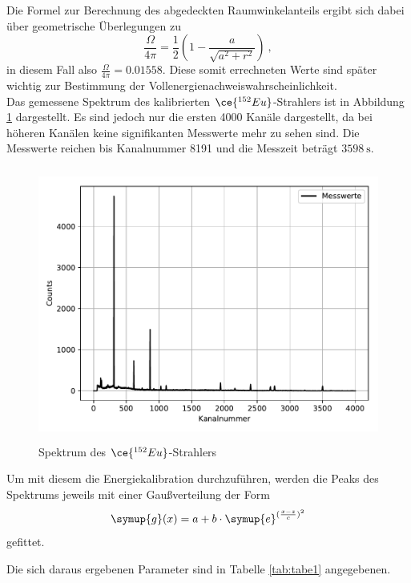 Die Formel zur Berechnung des abgedeckten Raumwinkelanteils ergibt sich dabei
über geometrische Überlegungen zu
\begin{equation}
  \frac{\Omega}{4\pi}= \frac{1}{2}(1-\frac{a}{\sqrt{a^2+r^2}})   \: ,
\end{equation}
in diesem Fall also $\frac{\Omega}{4\pi}= 0.01558$.
Diese somit errechneten Werte sind später wichtig zur Bestimmung der Vollenergienachweiswahrscheinlichkeit. \\
Das gemessene Spektrum des kalibrierten $\ce{^{152}Eu}$-Strahlers ist in Abbildung
\ref{fig:plot1} dargestellt. Es sind jedoch nur die ersten 4000 Kanäle dargestellt,
da bei höheren Kanälen keine signifikanten Messwerte mehr zu sehen sind. Die Messwerte
reichen bis Kanalnummer 8191 und die Messzeit beträgt $\SI{3598}{\second}$.
\begin{figure}
  \centering
  \includegraphics[height=9cm]{Eu.pdf}
  \caption{Spektrum des $\ce{^{152}Eu}$-Strahlers}
  \label{fig:plot1}
\end{figure}

Um mit diesem die Energiekalibration durchzuführen, werden die Peaks des Spektrums
jeweils mit einer Gaußverteilung der Form
\begin{equation}
  \symup{g} (x) = a + b \cdot \symup{e}^{(\frac{x-z}{c})^2}
  \label{eqn:gausk}
\end{equation}
gefittet.

Die sich daraus ergebenen Parameter sind in Tabelle \ref{tab:tabe1} angegebenen.


